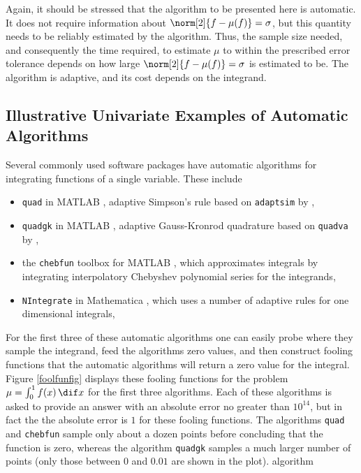 \documentclass[graybox]{svmult}
\begin{document}
Again, it should be stressed that the algorithm to be presented here is automatic.  It does not require information about $\norm[2]{f-\mu(f)}=\sigma$, but this quantity needs to be reliably estimated by the algorithm. Thus, the sample size needed, and consequently the time required, to estimate $\mu$ to within the prescribed error tolerance depends on how large $\norm[2]{f-\mu(f)}=\sigma$ is estimated to be.  The algorithm is adaptive, and its cost depends on the integrand.

\subsection{Illustrative Univariate Examples of Automatic Algorithms}

Several commonly used software packages have automatic algorithms for integrating functions of a single variable.  These include 
\begin{itemize} 

\item {\tt quad} in MATLAB \citep{MAT7.12}, adaptive Simpson's rule based on {\tt adaptsim} by \cite{GanGau00a},

\item {\tt quadgk} in MATLAB \citep{MAT7.12}, adaptive Gauss-Kronrod quadrature based on {\tt quadva} by \cite{Sha08a}, 

\item the {\tt chebfun} \citep{TrefEtal12} toolbox for MATLAB \citep{MAT7.12}, which approximates integrals by integrating interpolatory Chebyshev polynomial series for the integrands, 

\item {\tt NIntegrate} in Mathematica \citep{Mat8a}, which uses a number of adaptive rules for one dimensional integrals, 

\end{itemize}

For the first three of these automatic algorithms one can easily probe where they sample the integrand, feed the algorithms zero values, and then construct fooling functions that the automatic algorithms will return a zero value for the integral.  Figure \ref{foolfunfig} displays these fooling functions for the problem $\mu=\int_0^1 f(x) \, \dif x$ for the first three algorithms. Each of these algorithms is asked to provide an answer with an absolute error no greater than $10^{14}$, but in fact the the absolute error is $1$ for these fooling functions.  The algorithms {\tt quad} and {\tt chebfun} sample only about a dozen points before concluding that the function is zero, whereas the algorithm {\tt quadgk} samples a much larger number of points (only those between $0$ and $0.01$ are shown in the plot). algorithm
\end{document}
